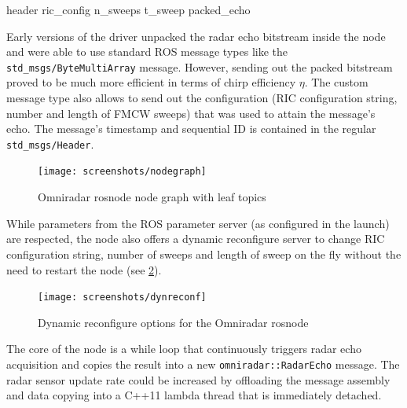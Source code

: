 \begin{Shaded}
\begin{Highlighting}[]
 header
 ric_config
 n_sweeps
 t_sweep
 packed_echo
\end{Highlighting}
\end{Shaded}


Early versions of the driver unpacked the radar echo bitstream inside
the node and were able to use standard ROS message types like the
\texttt{std\_msgs/ByteMultiArray} message. However, sending out the
packed bitstream proved to be much more efficient in terms of chirp
efficiency \(\eta\). The custom message type also allows to send out the
configuration (RIC configuration string, number and length of FMCW
sweeps) that was used to attain the message's echo. The message's
timestamp and sequential ID is contained in the regular
\texttt{std\_msgs/Header}.

\begin{figure}[htbp]
    \centering
    \texttt{[image: screenshots/nodegraph]}
    \caption{Omniradar rosnode node graph with leaf topics}
    \label{fig:nodegraph}
\end{figure}

While parameters from the ROS parameter server (as configured in the
launch) are respected, the node also offers a dynamic reconfigure server
to change RIC configuration string, number of sweeps and length of sweep
on the fly without the need to restart the node (see \cref{fig:dynreconf}).

\begin{figure}[htbp]
    \centering
    \texttt{[image: screenshots/dynreconf]}
    \caption{Dynamic reconfigure options for the Omniradar rosnode}
    \label{fig:dynreconf}
\end{figure}

The core of the node is a while loop that continuously triggers radar
echo acquisition and copies the result into a new
\texttt{omniradar::RadarEcho} message. The radar sensor update rate
could be increased by offloading the message assembly and data copying
into a C++11 lambda thread that is immediately detached.


